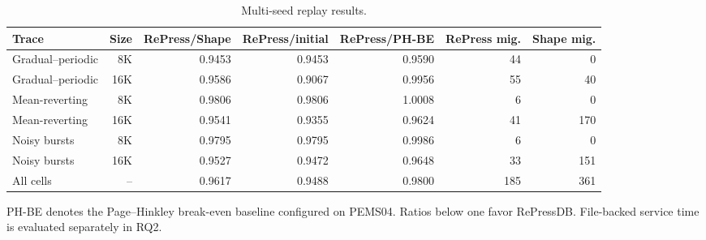 \begin{table}[!tbp]
\centering
\caption{Multi-seed replay results.}
\label{tab:multiseed_cost}
\begin{threeparttable}
\begin{tabular}{@{}lrrrrrr@{}}
\toprule
Trace & Size & RePress/Shape & RePress/initial & RePress/PH-BE & RePress mig. & Shape mig. \\
\midrule
Gradual--periodic & 8K & 0.9453 & 0.9453 & 0.9590 & 44 & 0 \\
Gradual--periodic & 16K & 0.9586 & 0.9067 & 0.9956 & 55 & 40 \\
Mean-reverting & 8K & 0.9806 & 0.9806 & 1.0008 & 6 & 0 \\
Mean-reverting & 16K & 0.9541 & 0.9355 & 0.9624 & 41 & 170 \\
Noisy bursts & 8K & 0.9795 & 0.9795 & 0.9986 & 6 & 0 \\
Noisy bursts & 16K & 0.9527 & 0.9472 & 0.9648 & 33 & 151 \\
\midrule
All cells & -- & 0.9617 & 0.9488 & 0.9800 & 185 & 361 \\
\bottomrule
\end{tabular}
\begin{tablenotes}[flushleft]\footnotesize
\item PH-BE denotes the Page--Hinkley break-even baseline configured on PEMS04. Ratios below one favor RePressDB. File-backed service time is evaluated separately in RQ2.
\end{tablenotes}
\end{threeparttable}
\end{table}
